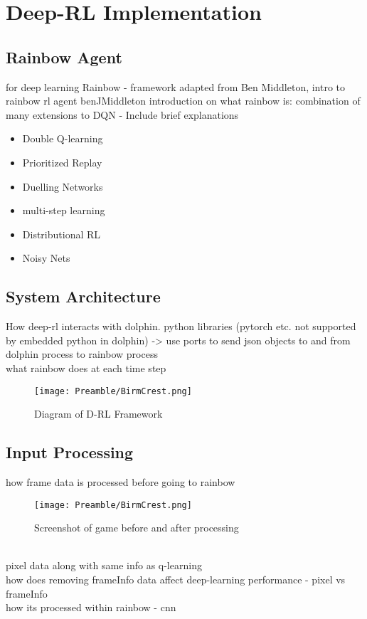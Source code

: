 
\chapter{Deep-RL Implementation}
\section{Rainbow Agent}
for deep learning Rainbow - framework adapted from Ben Middleton, intro to rainbow rl agent
benJMiddleton\cite{BenJMiddleton}
introduction on what rainbow is: combination of many extensions to DQN - Include brief explanations\cite{hessel2018rainbow}

\begin{itemize}
    \item Double Q-learning \cite{van2016doubleq}
    \item Prioritized Replay \cite{schaul2015prioritized}
    \item Duelling Networks \cite{wang2016dueling}
    \item multi-step learning \cite{sutton2018reinforcement}
    \item Distributional RL\cite{bellemare2017distributional}
    \item Noisy Nets\cite{DBLP:journals/corr/FortunatoAPMOGM17}
\end{itemize}

\section{System Architecture}
How deep-rl interacts with dolphin. python libraries (pytorch etc. not supported by embedded python in dolphin) -> use ports to send json objects to and from dolphin process to rainbow process
\\ what rainbow does at each time step

\begin{figure}[ht]
    \centering
    \texttt{[image: Preamble/BirmCrest.png]}
    \caption{Diagram of D-RL Framework}
    \label{fig:rainbow-arch}
\end{figure}

\section{Input Processing}
how frame data is processed before going to rainbow
\begin{figure}[ht]
    \centering
    \texttt{[image: Preamble/BirmCrest.png]}
    \caption{Screenshot of game before and after processing}
    \label{fig:frame-processing}
\end{figure}
\\pixel data along with same info as q-learning
\\how does removing frameInfo data affect deep-learning performance - pixel vs frameInfo
\\how its processed within rainbow - cnn
